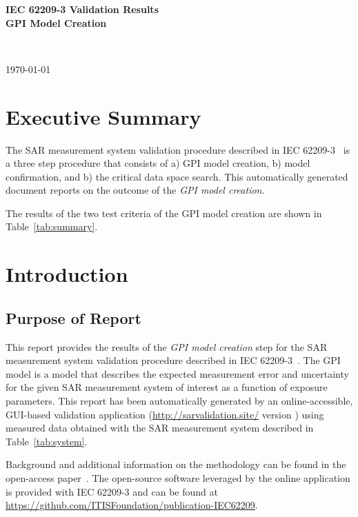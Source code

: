 \documentclass{article}
\begin{document}
\flushright
\begin{Large}
\textbf{IEC 62209-3 Validation Results} \\
\textbf{GPI Model Creation}
\end{Large} \\
\begin{small}
\today \\ \currenttime
\end{small}
\flushleft

\section{Executive Summary}\label{sec:exec_summary}

The SAR measurement system validation procedure described in IEC 62209-3~\cite{standard} is a three step procedure that consists of a) GPI model creation, b) model confirmation, and b) the critical data space search. This automatically generated document reports on the outcome of the \textit{GPI model creation}.



The results of the two test criteria of the GPI model creation are shown in Table~\ref{tab:summary}.





\section{Introduction}\label{sec:start}

\subsection{Purpose of Report}\label{sec:intro}
This report provides the results of the\textit{ GPI model creation} step for the SAR measurement system validation procedure described in IEC 62209-3~\cite{standard}. The GPI model is a model that describes the expected measurement error and uncertainty for the given SAR measurement system of interest as a function of exposure parameters. This report has been automatically generated by an online-accessible, GUI-based validation application (\url{http://sarvalidation.site/} version ) using measured data obtained with the SAR measurement system described in Table~\ref{tab:system}.

Background and additional information on the methodology can be found in the open-access paper~\cite{gpi-paper}. The open-source software leveraged by the online application is provided with IEC 62209-3 and can be found at
\url{https://github.com/ITISFoundation/publication-IEC62209}.
\end{document}

